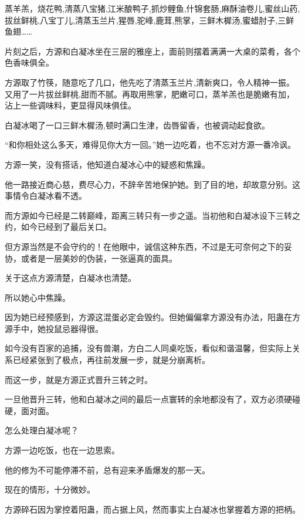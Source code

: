 
\begin{this_body}



蒸羊羔，烧花鸭,清蒸八宝猪,江米酿鸭子,抓炒鲤鱼,什锦套肠,麻酥油卷儿,蜜丝山药,拔丝鲜桃,八宝丁儿,清蒸玉兰片,猩唇,驼峰,鹿茸,熊掌，三鲜木樨汤,蜜蜡肘子,三鲜鱼翅……

片刻之后，方源和白凝冰坐在三层的雅座上，面前则摆着满满一大桌的菜肴，各个色香味俱全。

方源取了竹筷，随意吃了几口，他先吃了清蒸玉兰片,清新爽口，令人精神一振。又用了一片拔丝鲜桃,甜而不腻。再取用熊掌，肥嫩可口，蒸羊羔也是脆嫩有加，沾上一些调味料，更显得风味俱佳。

白凝冰喝了一口三鲜木樨汤,顿时满口生津，齿唇留香，也被调动起食欲。

“和你相处这么多天，难得见你大方一回。”她一边吃着，也不忘对方源一番冷讽。

方源一笑，没有搭话，他知道白凝冰心中的疑惑和焦躁。

他一路接近商心慈，费尽心力，不辞辛苦地保护她。到了目的地，却故意分别。这事情令白凝冰看不透。

而方源如今已经是二转巅峰，距离三转只有一步之遥。当初他和白凝冰设下三转之约，如今已经到了最后关口。

但方源当然是不会守约的！在他眼中，诚信这种东西，不过是无可奈何之下的妥协，或者是一层美妙的伪装，一张逼真的面具。

关于这点方源清楚，白凝冰也清楚。

所以她心中焦躁。

因为她已经预感到，方源这混蛋必定会毁约。但她偏偏拿方源没有办法，阳蛊在方源手中，她投鼠忌器得很。

如今没有百家的追捕，没有兽潮，方白二人同桌吃饭，看似和谐温馨，但实际上关系已经紧张到了极点，再往前发展一步，就是分崩离析。

而这一步，就是方源正式晋升三转之时。

一旦他晋升三转，他和白凝冰之间的最后一点寰转的余地都没有了，双方必须硬碰硬，面对面。

怎么处理白凝冰呢？

方源一边吃饭，也在一边思索。

他的修为不可能停滞不前，总有迎来矛盾爆发的那一天。

现在的情形，十分微妙。

方源碎石因为掌控着阳蛊，而占据上风，然而事实上白凝冰也掌握着方源的把柄。


\end{this_body}
